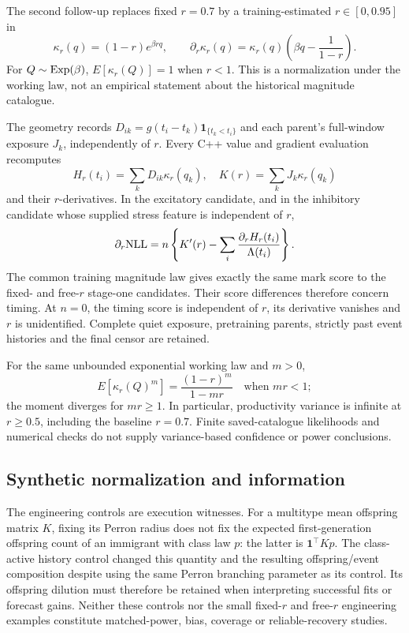 The second follow-up replaces fixed \(r=0.7\) by a training-estimated
\(r\in[0,0.95]\) in
\begin{equation}
 \kappa_r(q)=(1-r)e^{\beta rq},\qquad
 \partial_r\kappa_r(q)=\kappa_r(q)
            \left(\beta q-\frac{1}{1-r}\right).
 \label{a2:productivity}
\end{equation}
For \(Q\sim{\rm Exp}(\beta)\), \(E[\kappa_r(Q)]=1\) when \(r<1\).
This is a normalization under the working law, not an empirical statement
about the historical magnitude catalogue.

The geometry records \(D_{ik}=g(t_i-t_k)\mathbf 1_{\{t_k<t_i\}}\)
and each parent's full-window exposure \(J_k\), independently of \(r\).
Every C++ value and gradient evaluation recomputes
\[
 H_r(t_i)=\sum_k D_{ik}\kappa_r(q_k),\quad
 K(r)=\sum_kJ_k\kappa_r(q_k)
\]
and their \(r\)-derivatives. In the excitatory candidate, and in the
inhibitory candidate whose supplied stress feature is independent of \(r\),
\begin{equation}
 \partial_r{\rm NLL}
 =n\left\{K'(r)-\sum_i\frac{\partial_rH_r(t_i)}{\Lambda(t_i)}\right\}.
 \label{a2:r-gradient}
\end{equation}
The common training magnitude law gives exactly the same mark score to
the fixed- and free-\(r\) stage-one candidates. Their score differences
therefore concern timing. At \(n=0\), the timing score is independent of
\(r\), its derivative vanishes and \(r\) is unidentified. Complete quiet
exposure, pretraining parents,
strictly past event histories and the final censor are retained.

For the same unbounded exponential working law and \(m>0\),
\[
 E[\kappa_r(Q)^m]=\frac{(1-r)^m}{1-mr}
 \quad\text{when }mr<1;
\]
the moment diverges for \(mr\geq1\). In particular, productivity variance
is infinite at \(r\geq0.5\), including the baseline \(r=0.7\).
Finite saved-catalogue likelihoods and numerical checks do not supply
variance-based confidence or power conclusions.

\subsection{Synthetic normalization and information}

The engineering controls are execution witnesses. For a multitype mean
offspring matrix \(K\), fixing its Perron radius does not fix the expected
first-generation offspring count of an immigrant with class law \(p\):
the latter is \(\mathbf 1^\top Kp\). The class-active history control
changed this quantity and the resulting offspring/event composition despite
using the same Perron branching parameter as its control. Its offspring
dilution must therefore be retained when interpreting successful fits or
forecast gains. Neither these controls nor the small fixed-\(r\) and
free-\(r\) engineering examples constitute matched-power, bias, coverage or
reliable-recovery studies.
